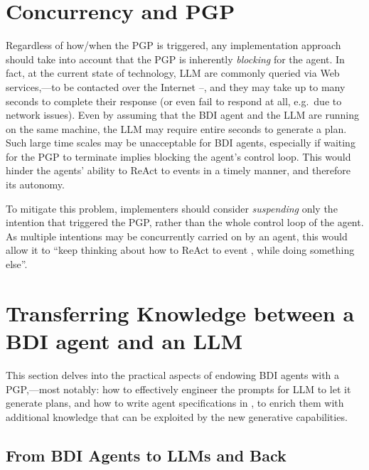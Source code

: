 \documentclass[12pt,a4paper,openright,twoside]{book}
\begin{document}
\section{Concurrency and PGP}


Regardless of how/when the \ac{PGP} is triggered, any implementation approach should take into account that the \ac{PGP} is inherently \emph{blocking} for the agent.
%
In fact, at the current state of technology, \ac{LLM} are commonly queried via Web services,---to be contacted over the Internet --, and they may take up to many seconds to complete their response (or even fail to respond at all, e.g.\ due to network issues).
%
Even by assuming that the \ac{BDI} agent and the \ac{LLM} are running on the same machine, the \ac{LLM} may require entire seconds to generate a plan.
%
Such large time scales may be unacceptable for \ac{BDI} agents, especially if waiting for the \ac{PGP} to terminate implies blocking the agent's control loop.
%
This would hinder the agents' ability to \ac{ReAct} to events in a timely manner, and therefore its autonomy.

To mitigate this problem, implementers should consider \emph{suspending} only the intention that triggered the \ac{PGP}, rather than the whole control loop of the agent.
%
As multiple intentions may be concurrently carried on by an \agentspeak{} agent, this would allow it to ``keep thinking about how to \ac{ReAct} to event , while doing something else''.

\section{Transferring Knowledge between a BDI agent and an LLM}\label{sec:remarks}

This section delves into the practical aspects of endowing \ac{BDI} agents with a \ac{PGP},---most notably: how to effectively engineer the prompts for \ac{LLM} to let it generate plans, and how to write agent specifications in \agentspeak{}, to enrich them with additional knowledge that can be exploited by the new generative capabilities.

\subsection{From \acs{BDI} Agents to \acp{LLM} and Back}
\end{document}
